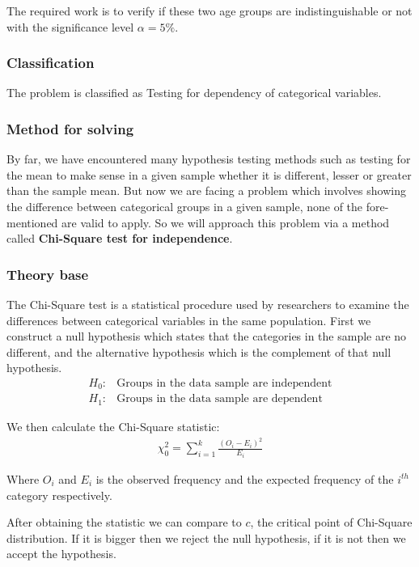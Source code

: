 \documentclass[a4paper]{article}
\numberwithin{equation}{section}
\begin{document}
The required work is to verify if these two age groups are indistinguishable or not with the significance level \( \alpha = 5\% \).

\subsubsection{Classification}
The problem is classified as Testing for dependency of categorical variables.

\subsubsection{Method for solving}
By far, we have encountered many hypothesis testing methods such as testing for the mean to make sense in a given sample whether it is different, lesser or greater than the sample mean. But now we are facing a problem which involves showing the difference between categorical groups in a given sample, none of the fore-mentioned are valid to apply. So we will approach this problem via a method called \textbf{Chi-Square test for independence}.

\subsubsection{Theory base}\label{p2:theory}
The Chi-Square test is a statistical procedure used by researchers to examine the differences between categorical variables in the same population. First we construct a null hypothesis which states that the categories in the sample are no different, and the alternative hypothesis which is the complement of that null hypothesis.
\begin{align*}
  H_0: & \text{Groups in the data sample are independent} \\
  H_1: & \text{Groups in the data sample are dependent}
\end{align*}

We then calculate the Chi-Square statistic:
\begin{align*}
  \chi_0^2 = \sum_{i = 1}^{k} \frac{{(O_i - E_i)}^2}{E_i}
\end{align*}\label{chi:stat}

Where \(O_i\) and \(E_i\) is the observed frequency and the expected frequency of the \(i^{th}\) category respectively.

After obtaining the statistic we can compare to \(c\), the critical point of Chi-Square distribution. If it is bigger then we reject the null hypothesis, if it is not then we accept the hypothesis.
\end{document}
